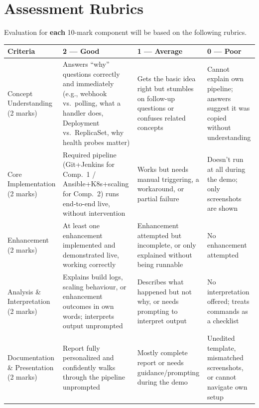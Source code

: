 \documentclass[12pt,a4paper]{article}
\newcommand{\sizeTwelve}{\fontsize{12pt}{14.5pt}\selectfont}  %
\begin{document}
\newpage

\section*{Assessment Rubrics}
{\sizeTwelve Evaluation for \textbf{each} 10-mark component will be based on the following rubrics.\par}

\vspace{0.4cm}

{\sizeTwelve
\setlength{\tabcolsep}{4pt}
\renewcommand{\arraystretch}{1.25}
\begin{longtable}{|>{\raggedright\arraybackslash}p{3.0cm}|>{\raggedright\arraybackslash}p{3.5cm}|>{\raggedright\arraybackslash}p{3.5cm}|>{\raggedright\arraybackslash}p{3.5cm}|}
\hline

\textbf{Criteria} & \textbf{2 --- Good} & \textbf{1 --- Average} & \textbf{0 --- Poor} \\

\hline
\endhead
Concept Understanding (2 marks) & Answers ``why'' questions correctly and immediately (e.g., webhook vs.\ polling, what a handler does, Deployment vs.\ ReplicaSet, why health probes matter) & Gets the basic idea right but stumbles on follow-up questions or confuses related concepts & Cannot explain own pipeline; answers suggest it was copied without understanding \\
\hline
Core Implementation (2 marks) & Required pipeline (Git+Jenkins for Comp.\ 1 / Ansible+K8s+scaling for Comp.\ 2) runs end-to-end live, without intervention & Works but needs manual triggering, a workaround, or partial failure & Doesn't run at all during the demo; only screenshots are shown \\
\hline
Enhancement (2 marks) & At least one enhancement implemented and demonstrated live, working correctly & Enhancement attempted but incomplete, or only explained without being runnable & No enhancement attempted \\
\hline
Analysis \& Interpretation (2 marks) & Explains build logs, scaling behaviour, or enhancement outcomes in own words; interprets output unprompted & Describes what happened but not why, or needs prompting to interpret output & No interpretation offered; treats commands as a checklist \\
\hline
Documentation \& Presentation (2 marks) & Report fully personalized and confidently walks through the pipeline unprompted & Mostly complete report or needs guidance/prompting during the demo & Unedited template, mismatched screenshots, or cannot navigate own setup \\
\hline
\end{longtable}
\par}
\end{document}
